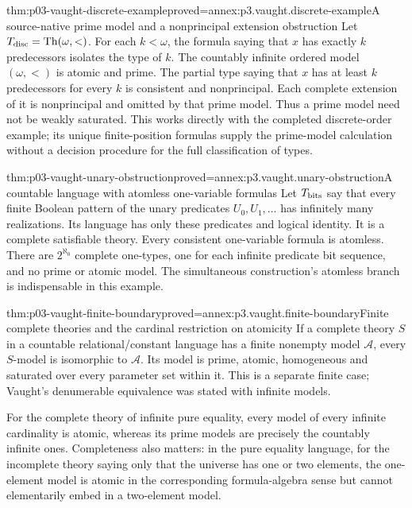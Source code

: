 \begin{hbtheorem}{thm:p03-vaught-discrete-example}{proved=annex:p3.vaught.discrete-example}{A source-native prime model and a nonprincipal extension obstruction}
Let \(T_{\rm disc}=\operatorname{Th}(\omega,<)\).
For each \(k<\omega\), the formula saying that \(x\) has exactly
\(k\) predecessors isolates the type of \(k\).
The countably infinite ordered model \((\omega,<)\) is atomic and prime.
The partial type saying that \(x\) has at least \(k\) predecessors
for every \(k\) is consistent and nonprincipal.
Each complete extension of it is nonprincipal and omitted by
that prime model. Thus a prime model need not be weakly saturated.
This works directly with the completed discrete-order example;
its unique finite-position formulas supply the prime-model calculation
without a decision procedure for the full classification of types.
\end{hbtheorem}

\begin{hbtheorem}{thm:p03-vaught-unary-obstruction}{proved=annex:p3.vaught.unary-obstruction}{A countable language with atomless one-variable formulas}
Let \(T_{\rm bits}\) say that every finite Boolean pattern of the
unary predicates \(U_0,U_1,\ldots\) has infinitely many realizations.
Its language has only these predicates and logical identity.
It is a complete satisfiable theory.
Every consistent one-variable formula is atomless.
There are \(2^{\aleph_0}\) complete one-types, one for each
infinite predicate bit sequence, and no prime or atomic model.
The simultaneous construction's atomless branch is indispensable
in this example.
\end{hbtheorem}

\begin{hbtheorem}{thm:p03-vaught-finite-boundary}{proved=annex:p3.vaught.finite-boundary}{Finite complete theories and the cardinal restriction on atomicity}
If a complete theory \(S\) in a countable relational/constant language
has a finite nonempty model \(\mathcal A\), every \(S\)-model is
isomorphic to \(\mathcal A\). Its model is prime, atomic,
homogeneous and saturated over every parameter set within it.
This is a separate finite case; Vaught's denumerable equivalence
was stated with infinite models.

For the complete theory of infinite pure equality, every model
of every infinite cardinality is atomic, whereas its prime models
are precisely the countably infinite ones.
Completeness also matters: in the pure equality language, for the
incomplete theory saying only
that the universe has one or two elements, the one-element model
is atomic in the corresponding formula-algebra sense but cannot
elementarily embed in a two-element model.
\end{hbtheorem}

